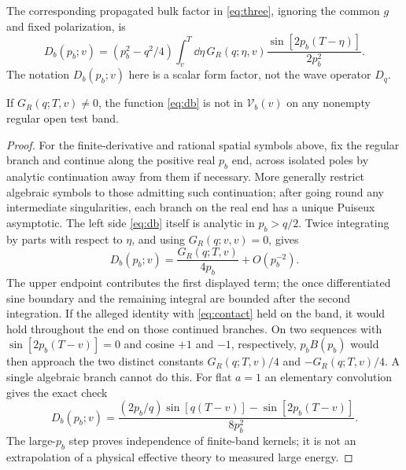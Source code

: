 The corresponding propagated bulk factor in \eqref{eq:three}, ignoring the common \(g\) and fixed polarization, is
\begin{equation}
 D_b(p_b;v)=(p_b^2-q^2/4)\int_v^T\dd\eta\,
          G_R(q;\eta,v)\frac{\sin[2p_b(T-\eta)]}{2p_b^2}.
 \label{eq:db}
\end{equation}
The notation \(D_b(p_b;v)\) here is a scalar form factor, not the wave operator \(D_q\).
\begin{proposition}
\label{prop:nonspan}
If \(G_R(q;T,v)\ne0\), the function \eqref{eq:db} is not in \(\mathcal V_b(v)\) on any nonempty regular open test band.
\end{proposition}
\begin{proof}
For the finite-derivative and rational spatial symbols above, fix the regular branch and continue along the positive real \(p_b\) end, across isolated poles by analytic continuation away from them if necessary. More generally restrict algebraic symbols to those admitting such continuation; after going round any intermediate singularities, each branch on the real end has a unique Puiseux asymptotic. The left side \eqref{eq:db} itself is analytic in \(p_b>q/2\). Twice integrating by parts with respect to \(\eta\), and using \(G_R(q;v,v)=0\), gives
\begin{equation}
 D_b(p_b;v)=\frac{G_R(q;T,v)}{4p_b}+O(p_b^{-2}).
 \label{eq:continuation}
\end{equation}
The upper endpoint contributes the first displayed term; the once differentiated sine boundary and the remaining integral are bounded after the second integration. If the alleged identity with \eqref{eq:contact} held on the band, it would hold throughout the end on those continued branches. On two sequences with \(\sin[2p_b(T-v)]=0\) and cosine \(+1\) and \(-1\), respectively, \(p_bB(p_b)\) would then approach the two distinct constants \(G_R(q;T,v)/4\) and \(-G_R(q;T,v)/4\). A single algebraic branch cannot do this. For flat \(a=1\) an elementary convolution gives the exact check
\[
 D_b(p_b;v)=\frac{(2p_b/q)\sin[q(T-v)]-\sin[2p_b(T-v)]}{8p_b^2}.
\]
The large-\(p_b\) step proves independence of finite-band kernels; it is not an extrapolation of a physical effective theory to measured large energy.
\end{proof}

